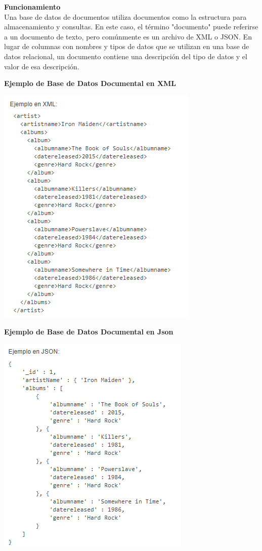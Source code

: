\documentclass[twoside,onecolumn]{article}
\begin{document}
\begin{flushright}
\begin{itemize}
\textbf{Funcionamiento}\\
Una base de datos de documentos utiliza documentos como la estructura para almacenamiento y consultas. En este caso, el término "documento" puede referirse a un documento de texto, pero comúnmente es un archivo de XML o JSON. En lugar de columnas con nombres y tipos de datos que se utilizan en una base de datos relacional, un documento contiene una descripción del tipo de datos y el valor de esa descripción.

\textbf{Ejemplo de Base de Datos Documental en XML}\\
\begin{center}
\includegraphics[scale=0.7]{Imagenes/EjemploDocumental.png}
\end{center}	

\textbf{Ejemplo de Base de Datos Documental en Json}\\
\begin{center}
\includegraphics[scale=0.7]{Imagenes/EjemploDocumentalJson.png}
\end{center}


\end{itemize}
\end{flushright}
\end{document}
